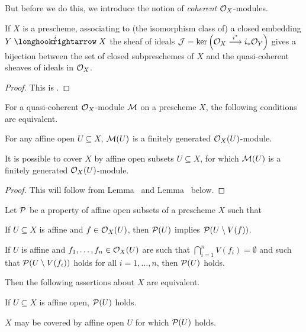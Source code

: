 \documentclass[a4paper,parskip=half,numbers=enddot, DIV=12]{scrreprt}
\begin{document}
But before we do this, we introduce the notion of \emph{coherent} $\mathcal{O}_X$-modules.
\begin{prop}
	If $X$ is a prescheme, associating to (the isomorphism class of) a closed embedding $Y\monomorphism[i]X$ the sheaf of ideals $\Jj=\ker\Big(\Oo_X\morphism[i^*]i_*\Oo_Y\Big)$ gives a bijection between the set of closed subpreschemes of $X$ and the quasi-coherent sheaves of ideals in $\mathcal{O}_X$.
\end{prop}
\begin{proof}
	This is \cite[Proposition~1.5.3]{alggeo1}.
\end{proof}
\begin{lem}
	For a quasi-coherent $\mathcal{O}_X$-module $\mathcal{M}$ on a prescheme $X$, the following conditions are equivalent.
	\begin{alphanumerate}
		\item For any affine open $U\subseteq X$, $\mathcal{M}(U)$ is a finitely generated $\mathcal{O}_X(U)$-module.
		\item It is possible to cover $X$ by affine open subsets $U\subseteq X$, for which $\mathcal{M}(U)$ is a finitely generated $\mathcal{O}_X(U)$-module.
	\end{alphanumerate}
\end{lem}
\begin{proof}
	This will follow from Lemma~ and Lemma~ below.
\end{proof}
\begin{lem}
	Let $\mathcal{P}$ be a property of affine open subsets of a prescheme $X$ such that
	\begin{alphanumerate}
		\item[\itememph{\alpha}] If $U\subseteq X$ is affine and $f\in\mathcal{O}_X(U)$, then $\mathcal{P}(U)$ implies $\mathcal{P}(U\setminus V(f))$.
		\item[\itememph{\beta}] If $U$ is affine and $f_1,\ldots,f_n\in\mathcal{O}_X(U)$ are such that $\bigcap_{i=1}^nV(f_i)=\emptyset$ and such that $\mathcal{P}(U\setminus V(f_i))$ holds for all $i=1,\ldots,n$, then $\mathcal{P}(U)$ holds.
	\end{alphanumerate}
	Then the following assertions about $X$ are equivalent.
	\begin{alphanumerate}
		\item If $U\subseteq X$ is affine open, $\mathcal{P}(U)$ holds.
		\item $X$ may be covered by affine open $U$ for which $\mathcal{P}(U)$ holds.
	\end{alphanumerate}
\end{lem}
\end{document}
